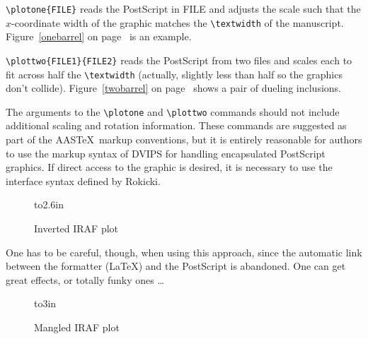 \hangindent=3pc 
\noindent
\verb"\plotone{FILE}" reads the PostScript in FILE and adjusts
the scale such that the $x$-coordinate width of the graphic matches
the \verb"\textwidth" of the manuscript.
Figure~\ref{onebarrel} on page~\pageref{onebarrel} is an example.

\hangindent=3pc 
\noindent
\verb"\plottwo{FILE1}{FILE2}" reads the PostScript from two
files and scales each to fit across half the \verb"\textwidth"
(actually, slightly less than half so the graphics don't collide).
Figure~\ref{twobarrel} on page~\pageref{twobarrel} shows a pair
of dueling inclusions.

The arguments to the \verb"\plotone" and \verb"\plottwo" commands
should not include additional scaling and rotation information.
These commands are suggested as part of the AAS\TeX\ markup
conventions, but it is entirely reasonable for authors to use the
markup syntax of DVIPS for handling encapsulated PostScript graphics.
If direct access to the graphic is desired, it is necessary to use
the interface syntax defined by Rokicki.

\begin{figure}[h]
\vbox to2.6in{\rule{0pt}{2.6in}}
\caption{Inverted IRAF plot}
\end{figure}

One has to be careful, though, when using this approach, since the
automatic link between the formatter (\LaTeX) and the PostScript
is abandoned.  One can get great effects, or totally funky ones \ldots

\begin{figure}[h]
\vbox to3in{\rule{0pt}{3in}}
\caption{Mangled IRAF plot}
\end{figure}



